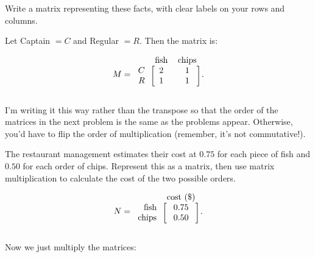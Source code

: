 \documentclass[../gatm_answers.tex]{subfiles}
\begin{document}
\begin{inner_problem}[start=1]
\item Write a matrix representing these facts, with clear labels on your rows and columns.
\end{inner_problem}

Let Captain $=C$ and Regular $=R$. Then the matrix is:

$$M=\begin{blockarray}{rcc}
& \text{fish} & \text{chips} \\
\begin{block}{r[cc]}
C & 2 & 1 \\
R & 1 & 1 \\
\end{block}
\end{blockarray}.$$

I'm writing it this way rather than the transpose so that the order of the matrices in the next problem is the same as the problems appear. Otherwise, you'd have to flip the order of multiplication (remember, it's not commutative!).

\begin{inner_problem}
\item The restaurant management estimates their cost at $0.75$ for each piece of fish and $0.50$ for each order of chips. Represent this as a matrix, then use matrix multiplication to calculate the cost of the two possible orders.
\end{inner_problem}

$$N=\begin{blockarray}{rc}
& \text{cost (\$)} \\
\begin{block}{r[c]}
\text{fish} & 0.75 \\
\text{chips} & 0.50 \\
\end{block}
\end{blockarray}.$$

Now we just multiply the matrices:
\end{document}
